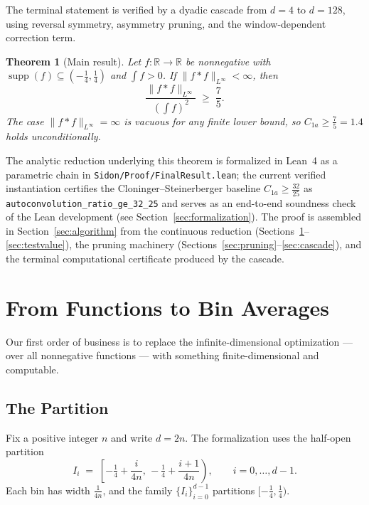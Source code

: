 \documentclass[11pt, letterpaper]{article}
\theoremstyle{paperplain}
\newtheorem{theorem}{Theorem}[section]
\theoremstyle{paperdef}
\newcommand{\R}{\mathbb{R}}
\newcommand{\supp}{\operatorname{supp}}
\begin{document}
The terminal statement is verified by a dyadic cascade from $d=4$ to
$d=128$, using reversal symmetry, asymmetry pruning, and the
window-dependent correction term.

\begin{theorem}[Main result]
\label{thm:main}
Let $f : \R \to \R$ be nonnegative with
$\supp(f) \subseteq (-\tfrac14,\tfrac14)$ and $\int f > 0$.  If
$\|f*f\|_{L^\infty} < \infty$, then
\[
  \frac{\|f*f\|_{L^\infty}}{\left(\int f\right)^2} \;\ge\; \frac75.
\]
The case $\|f*f\|_{L^\infty} = \infty$ is vacuous for any finite
lower bound, so $C_{1a} \ge \tfrac75 = 1.4$ holds unconditionally.
\end{theorem}

The analytic reduction underlying this theorem is formalized in
Lean~4 as a parametric chain in \texttt{Sidon/Proof/FinalResult.lean};
the current verified instantiation certifies the
Cloninger--Steinerberger baseline $C_{1a}\ge \tfrac{32}{25}$ as
\texttt{autoconvolution\_ratio\_ge\_32\_25} and serves as an
end-to-end soundness check of the Lean development (see
Section~\ref{sec:formalization}).  The proof is assembled in
Section~\ref{sec:algorithm} from the continuous reduction
(Sections~\ref{sec:bin}--\ref{sec:testvalue}), the pruning machinery
(Sections~\ref{sec:pruning}--\ref{sec:cascade}), and the terminal
computational certificate produced by the cascade.


\section{From Functions to Bin Averages}\label{sec:bin}

Our first order of business is to replace the infinite-dimensional
optimization --- over all nonnegative functions --- with something
finite-dimensional and computable.

\subsection{The Partition}

Fix a positive integer $n$ and write $d=2n$.  The formalization uses
the half-open partition
\[
  I_i
  \;=\;
  \left[-\tfrac14 + \frac{i}{4n},\,
        -\tfrac14 + \frac{i+1}{4n}\right),
  \qquad i=0,\dots,d-1.
\]
Each bin has width $\tfrac{1}{4n}$, and the family $\{I_i\}_{i=0}^{d-1}$
partitions $[-\tfrac14,\tfrac14)$.
\end{document}

